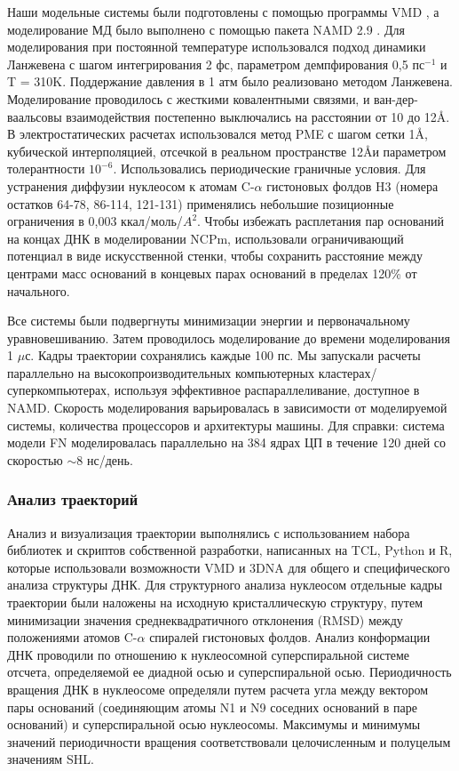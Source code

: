     Наши модельные системы были подготовлены с помощью программы VMD \cite{humphrey_vmd_1996}, а моделирование МД было выполнено с помощью пакета NAMD 2.9 \cite{phillips_scalable_2005}. Для моделирования при постоянной температуре использовался подход динамики Ланжевена с шагом интегрирования 2 фс, параметром демпфирования 0,5 $пс^{-1}$ и T = 310K. Поддержание давления в 1 атм было реализовано методом Ланжевена. Моделирование проводилось с жесткими ковалентными связями, и ван-дер-ваальсовы взаимодействия постепенно выключались на расстоянии от 10 до 12\AA. В электростатических расчетах использовался метод PME с шагом сетки 1\AA, кубической интерполяцией, отсечкой в реальном пространстве 12\AA и параметром толерантности $10^{-6}$. Использовались периодические граничные условия. Для устранения диффузии нуклеосом к атомам C-$\alpha$ гистоновых фолдов H3 (номера остатков 64-78, 86-114, 121-131) применялись небольшие позиционные ограничения в 0,003 ккал/моль/$A^2$. Чтобы избежать расплетания пар оснований на концах ДНК в моделировании NCPm, использовали ограничивающий потенциал в виде искусственной стенки, чтобы сохранить расстояние между центрами масс оснований в концевых парах оснований в пределах 120\% от начального.

    Все системы были подвергнуты минимизации энергии и первоначальному уравновешиванию. Затем проводилось моделирование до времени моделирования 1 $\mu$с. Кадры траектории сохранялись каждые 100 пс. Мы запускали расчеты параллельно на высокопроизводительных компьютерных кластерах/суперкомпьютерах, используя эффективное распараллеливание, доступное в NAMD. Скорость моделирования варьировалась в зависимости от моделируемой системы, количества процессоров и архитектуры машины. Для справки: система модели FN моделировалась параллельно на 384 ядрах ЦП в течение 120 дней со скоростью $\sim$8 нс/день.

\subsubsection{Анализ траекторий}
    Анализ и визуализация траектории выполнялись с использованием набора библиотек и скриптов собственной разработки, написанных на TCL, Python и R, которые использовали возможности VMD \cite{humphrey_vmd_1996} и 3DNA \cite{lu_3dna_2008} для общего и специфического анализа структуры ДНК. Для структурного анализа нуклеосом отдельные кадры траектории были наложены на исходную кристаллическую структуру, путем минимизации значения среднеквадратичного отклонения (RMSD) между положениями атомов C-$\alpha$ спиралей гистоновых фолдов. Анализ конформации ДНК проводили по отношению к нуклеосомной суперспиральной системе отсчета, определяемой ее диадной осью и суперспиральной осью. Периодичность вращения ДНК в нуклеосоме определяли путем расчета угла между вектором пары оснований (соединяющим атомы N1 и N9 соседних оснований в паре оснований) и суперспиральной осью нуклеосомы. Максимумы и минимумы значений периодичности вращения соответствовали целочисленным и полуцелым значениям SHL.
    
